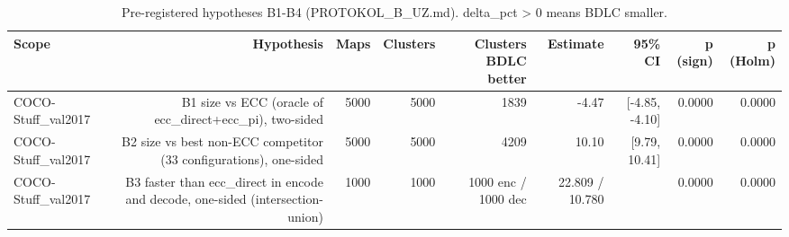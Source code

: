 \begin{table}[t]
\centering
\caption{Pre-registered hypotheses B1-B4 (PROTOKOL\_B\_UZ.md). delta\_pct > 0 means BDLC smaller.}
\begin{tabular}{lrrrrrrrr}
\hline
Scope & Hypothesis & Maps & Clusters & Clusters BDLC better & Estimate & 95\% CI & p (sign) & p (Holm) \\
\hline
COCO-Stuff\_val2017 & B1 size vs ECC (oracle of ecc\_direct+ecc\_pi), two-sided & 5000 & 5000 & 1839 & -4.47 & [-4.85, -4.10] & 0.0000 & 0.0000 \\
COCO-Stuff\_val2017 & B2 size vs best non-ECC competitor (33 configurations), one-sided & 5000 & 5000 & 4209 & 10.10 & [9.79, 10.41] & 0.0000 & 0.0000 \\
COCO-Stuff\_val2017 & B3 faster than ecc\_direct in encode and decode, one-sided (intersection-union) & 1000 & 1000 & 1000 enc / 1000 dec & 22.809 / 10.780 &  & 0.0000 & 0.0000 \\
\hline
\end{tabular}
\end{table}
